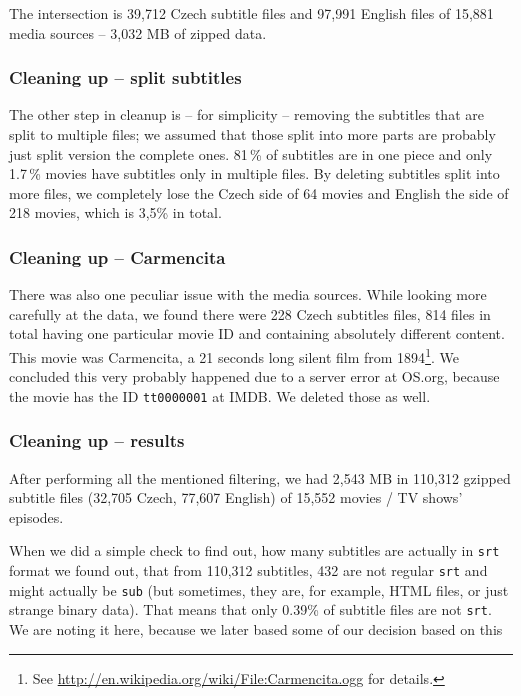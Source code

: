 The intersection is 39,712 Czech subtitle files and 97,991 English files of 15,881 media sources -- 3,032 MB of zipped data.

\subsubsection*{Cleaning up -- split subtitles}
The other step in cleanup is -- for simplicity -- removing the subtitles that are split to multiple files; we assumed that those split into more parts are probably just split version the complete ones. 81\,\% of subtitles are in one piece and only 1.7\,\% movies have subtitles only in multiple files. By deleting subtitles split into more files, we completely lose the Czech side of 64 movies and English the side of 218 movies, which is 3,5\% in total.

\subsubsection*{Cleaning up -- Carmencita}
There was also one peculiar issue with the media sources. While looking more carefully at the data, we found there were 228 Czech subtitles files, 814 files in total having one particular movie ID and containing absolutely different content. This movie was Carmencita, a 21 seconds long silent film from 1894\footnote{See \url{http://en.wikipedia.org/wiki/File:Carmencita.ogg} for details.}. We concluded this very probably happened due to a server error at OS.org, because the movie has the ID {\tt tt0000001} at IMDB. We deleted those as well.


\subsubsection*{Cleaning up -- results}
After performing all the mentioned filtering, we had 2,543 MB in 110,312 gzipped subtitle files (32,705 Czech, 77,607 English) of 15,552 movies / TV shows' episodes.

When we did a simple check to find out, how many subtitles are actually in \texttt{srt} format we found out, that from 110,312 subtitles, 432 are not regular \texttt{srt} and might actually be \texttt{sub} (but sometimes, they are, for example, HTML files, or just strange binary data). That means that only 0.39\% of subtitle files are not \texttt{srt}. We are noting it here, because we later based some of our decision based on this

